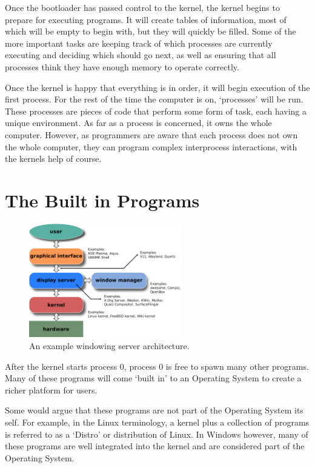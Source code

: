 \documentclass[a4paper]{report}
\begin{document}
Once the bootloader has passed control to the kernel, the kernel begins to prepare for executing programs. It will create tables of information, most of which will be empty to begin with, but they will quickly be filled. Some of the more important tasks are keeping track of which processes are currently executing and deciding which should go next, as well as ensuring that all processes think they have enough memory to operate correctly.

Once the kernel is happy that everything is in order, it will begin execution of the first process. For the rest of the time the computer is on, `processes' will be run. These processes are pieces of code that perform some form of task, each having a unique environment. As far as a process is concerned, it owns the whole computer. However, as programmers are aware that each process does not own the whole computer, they can program complex interprocess interactions, with the kernels help of course.


\section{The Built in Programs}

\begin{figure}
\centering
\includegraphics[width=250px]{images/windowing}
\caption{An example windowing server architecture.}
\label{fig:theserver}
\end{figure}

After the kernel starts process 0, process 0 is free to spawn many other programs. Many of these programs will come `built in' to an Operating System to create a richer platform for users.

Some would argue that these programs are not part of the Operating System its self. For example, in the Linux terminology, a kernel plus a collection of programs is referred to as a `Distro' or distribution of Linux. In Windows however, many of these programs are well integrated into the kernel and are considered part of the Operating System.
\end{document}
